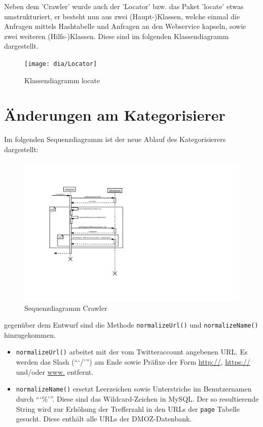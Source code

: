 Neben dem 'Crawler' wurde auch der 'Locator' bzw. das Paket 'locate' etwas umstrukturiert, er besteht nun aus zwei (Haupt-)Klassen, welche einmal die Anfragen mittels Hashtabelle und Anfragen an den Webservice kapseln, sowie zwei weiteren (Hilfs-)Klassen. Diese sind im folgenden Klassendiagramm dargestellt.
 \begin{figure}[H]
 	\centering
 	\texttt{[image: dia/Locator]}
 	\caption{Klassendiagramm locate}
 	\label{fig:locate}
 \end{figure}

\section{Änderungen am Kategorisierer}
Im folgenden Sequenzdiagramm ist der neue Ablauf des Kategorisierers dargestellt:
\begin{figure}[H]
	\centering
	\includegraphics[width=\textwidth,height=\textheight,keepaspectratio=true]{dia/categorizerSequence}
	\caption{Sequenzdiagramm Crawler}
	\label{fig:Crawler}
\end{figure}
gegenüber dem Entwurf sind die Methode \lstinline{normalizeUrl()} und \lstinline{normalizeName()} hinzugekommen.
\begin{itemize}
	\item \lstinline{normalizeUrl()} arbeitet mit der vom Twitteraccount angebenen URL. Es werden das Slash (```/''') am Ende sowie Präfixe der Form \url{http://}, \url{https://} und/oder \url{www.} entfernt.
	\item \lstinline{normalizeName()} ersetzt Leerzeichen sowie Unterstriche im Benutzernamen durch ```\%'''. Diese sind das Wildcard-Zeichen in MySQL. Der so resultierende String wird zur Erhöhung der Trefferzahl in den URLs der \lstinline{page} Tabelle gesucht. Diese enthält alle URLs der DMOZ-Datenbank.
\end{itemize}

